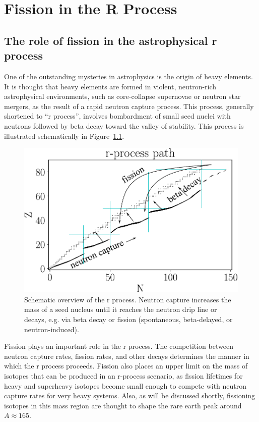 \chapter{Fission in the R Process}\label{chap:rprocess}

\section{The role of fission in the astrophysical r process}
One of the outstanding mysteries in astrophysics is the origin of heavy elements. It is thought that heavy elements are formed in violent, neutron-rich astrophysical environments, such as core-collapse supernovae or neutron star mergers, as the result of a rapid neutron capture process. This process, generally shortened to ``r process'', involves bombardment of small seed nuclei with neutrons followed by beta decay toward the valley of stability.  This process is illustrated schematically in Figure~\ref{fig:rprocpath}.

\begin{figure}
	\centering
	\includegraphics[width=0.8\linewidth]{TeX_files/rProc_path}
	\caption[Schematic overview of the r process]{Schematic overview of the r process. Neutron capture increases the mass of a seed nucleus until it reaches the neutron drip line or decays, e.g. via beta decay or fission (spontaneous, beta-delayed, or neutron-induced).}
	\label{fig:rprocpath}
\end{figure}

Fission plays an important role in the r process. The competition between neutron capture rates, fission rates, and other decays determines the manner in which the r process proceeds. Fission also places an upper limit on the mass of isotopes that can be produced in an r-process scenario, as fission lifetimes for heavy and superheavy isotopes become small enough to compete with neutron capture rates for very heavy systems. Also, as will be discussed shortly, fissioning isotopes in this mass region are thought to shape the rare earth peak around $A\approx165$.

